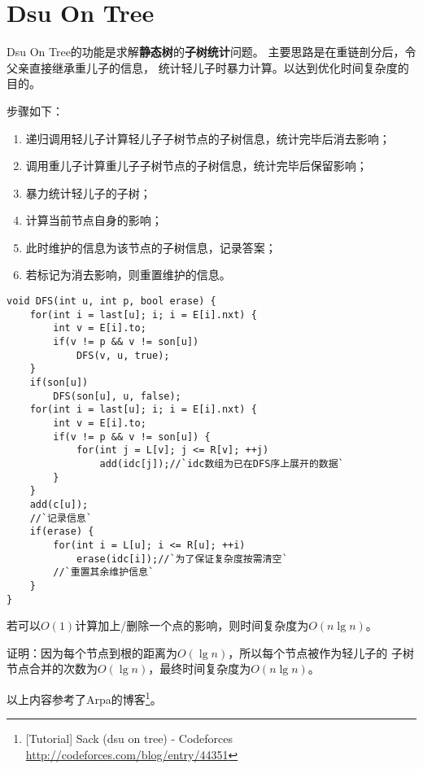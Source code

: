 \section{Dsu On Tree}
Dsu On Tree的功能是求解{\bfseries 静态树}的{\bfseries 子树统计}问题。
主要思路是在重链剖分后，令父亲直接继承重儿子的信息，
统计轻儿子时暴力计算。以达到优化时间复杂度的目的。

步骤如下：
\begin{enumerate}
    \item 递归调用轻儿子计算轻儿子子树节点的子树信息，统计完毕后消去影响；
    \item 调用重儿子计算重儿子子树节点的子树信息，统计完毕后保留影响；
    \item 暴力统计轻儿子的子树；
    \item 计算当前节点自身的影响；
    \item 此时维护的信息为该节点的子树信息，记录答案；
    \item 若标记为消去影响，则重置维护的信息。
\end{enumerate}

\begin{lstlisting}[title=Dsu On Tree]
void DFS(int u, int p, bool erase) {
    for(int i = last[u]; i; i = E[i].nxt) {
        int v = E[i].to;
        if(v != p && v != son[u])
            DFS(v, u, true);
    }
    if(son[u])
        DFS(son[u], u, false);
    for(int i = last[u]; i; i = E[i].nxt) {
        int v = E[i].to;
        if(v != p && v != son[u]) {
            for(int j = L[v]; j <= R[v]; ++j)
                add(idc[j]);//`idc数组为已在DFS序上展开的数据`
        }
    }
    add(c[u]);
    //`记录信息`
    if(erase) {
        for(int i = L[u]; i <= R[u]; ++i)
            erase(idc[i]);//`为了保证复杂度按需清空`
        //`重置其余维护信息`
    }
}
\end{lstlisting}

若可以$O(1)$计算加上/删除一个点的影响，则时间复杂度为$O(n\lg n)$。

证明：因为每个节点到根的距离为$O(\lg n)$，所以每个节点被作为轻儿子的
子树节点合并的次数为$O(\lg n)$，最终时间复杂度为$O(n\lg n)$。

以上内容参考了Arpa的博客\footnote{[Tutorial] Sack (dsu on tree) - Codeforces
    \url{http://codeforces.com/blog/entry/44351}
}。
